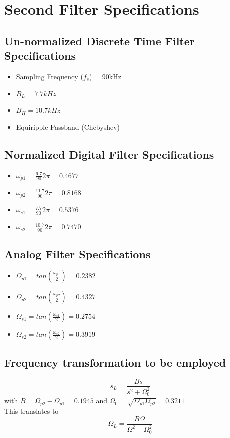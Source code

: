 \documentclass[22pt]{article}
\begin{document}
\section{Second Filter Specifications}
\subsection{Un-normalized Discrete Time Filter Specifications}
\begin{itemize}
\item Sampling Frequency ($f_s$) = 90kHz
\item $B_L = 7.7 kHz$
\item $B_H = 10.7 kHz$
\item Equiripple Passband (Chebyshev)
\end{itemize}
\subsection{Normalized Digital Filter Specifications}
\begin{itemize}
\item $\omega_{p1} = \frac{6.7}{90}2\pi = 0.4677$
\item $\omega_{p2} = \frac{11.7}{90}2\pi = 0.8168$
\item $\omega_{s1} = \frac{7.7}{90}2\pi = 0.5376$
\item $\omega_{s2} = \frac{10.7}{90}2\pi = 0.7470$
\end{itemize}
\subsection{Analog Filter Specifications}
\begin{itemize}
\item $\Omega_{p1} = tan(\frac{\omega_{p1}}{2}) = 0.2382$ 
\item $\Omega_{p2} = tan(\frac{\omega_{p2}}{2}) = 0.4327$
\item $\Omega_{s1} = tan(\frac{\omega_{s1}}{2}) = 0.2754$
\item $\Omega_{s2} = tan(\frac{\omega_{s2}}{2}) = 0.3919$
\end{itemize}
\subsection{Frequency transformation to be employed}
\begin{equation}
  \label{eq:3}
  s_L = \frac{Bs}{s^2 + \Omega_0^2}
\end{equation}
with $B = \Omega_{p2} - \Omega_{p1} = 0.1945$ and $\Omega_0 = \sqrt{\Omega_{p1}\Omega_{p2}} = 0.3211$
\\  This translates to
\begin{equation}
  \label{eq:4}
  \Omega_{L} = \frac{B\Omega}{\Omega^2 - \Omega_0^2}
\end{equation}
\end{document}
